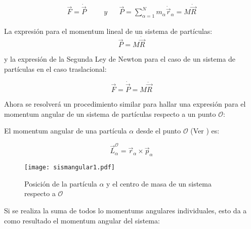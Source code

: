 \documentclass[/home/hernan/Documentos/Apuntes_mecanica_teorica/main.tex]{subfiles}
\begin{document}
		\begin{align*}
			\vec{F} = \dot{\vec{P}} \; \; \; \; \; \; &y \; \; \; \; \; \; \vec{P} = \sum_{\alpha = 1}^{N} m_{\alpha} \dot{\vec{r}}_{\alpha} = M\dot{\vec{R}}
		\end{align*}

    \begin{definition} 
		La expresión para el momentum lineal de un sistema de partículas:
		\begin{equation}
			\vec{P} = M\dot{\vec{R}}
			\label{eq: sismomentuml}
		\end{equation}

		y la expresión de la Segunda Ley de Newton para el caso de un sistema de partículas en el caso traslacional:

		\begin{equation}
			\vec{F} = \dot{\vec{P}} = M \ddot{\vec{R}}
			\label{eq: sisNSecondlaw}
		\end{equation}
    \end{definition}

	\newpage

	Ahora se resolverá un procedimiento similar para hallar una expresión para el momentum angular de un sistema de partículas respecto a un punto $\mathcal{O}$:

	El momentum angular de una partícula $\alpha$ desde el punto $\mathcal{O}$ (Ver ) es: 

	\begin{equation*}
		\vec{L}_{\alpha}^{\mathcal{O}} = \vec{r}_{\alpha} \times \vec{p}_{\alpha}
	\end{equation*}

	\begin{marginfigure}
		\begin{figure}[H]
			\texttt{[image: sismangular1.pdf]}
			\caption{Posición de la partícula $\alpha$ y el centro de masa de un sistema respecto a $\mathcal{O}$}
			\label{fig: sismangular1}
		\end{figure}
	\end{marginfigure}

	Si se realiza la suma de todos lo momentums angulares individuales, esto da a como resultado el momentum angular del sistema:
\end{document}
